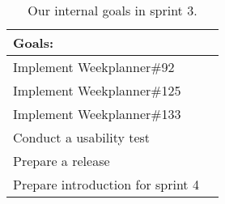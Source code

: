 \begin{table}[H]
    \centering
    \begin{tabular}{|l|l|}
    \hline
    Goals:                                   \\ \hline
    Implement Weekplanner\#92               \\ \hline
    Implement Weekplanner\#125              \\ \hline
    Implement Weekplanner\#133              \\ \hline
    Conduct a usability test                 \\ \hline
    Prepare a release                          \\ \hline
    Prepare introduction for sprint 4                         \\ \hline
    \end{tabular}
    \caption{Our internal goals in sprint 3.}
    \label{PO-goal-sprint-3}
\end{table}
